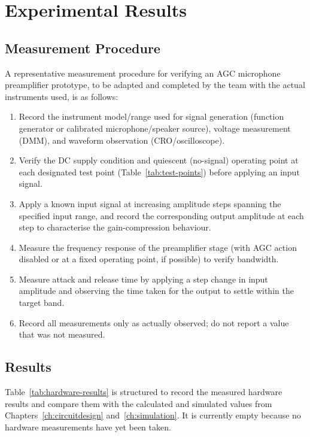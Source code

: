 \chapter{Experimental Results}
\label{ch:results}

\section{Measurement Procedure}

A representative measurement procedure for verifying an AGC microphone preamplifier prototype, to be adapted and completed by the team with the actual instruments used, is as follows:
\begin{enumerate}
    \item Record the instrument model/range used for signal generation (function generator or calibrated microphone/speaker source), voltage measurement (DMM), and waveform observation (CRO/oscilloscope).
    \item Verify the DC supply condition and quiescent (no-signal) operating point at each designated test point (Table~\ref{tab:test-points}) before applying an input signal.
    \item Apply a known input signal at increasing amplitude steps spanning the specified input range, and record the corresponding output amplitude at each step to characterise the gain-compression behaviour.
    \item Measure the frequency response of the preamplifier stage (with AGC action disabled or at a fixed operating point, if possible) to verify bandwidth.
    \item Measure attack and release time by applying a step change in input amplitude and observing the time taken for the output to settle within the target band.
    \item Record all measurements only as actually observed; do not report a value that was not measured.
\end{enumerate}

\section{Results}

Table~\ref{tab:hardware-results} is structured to record the measured hardware results and compare them with the calculated and simulated values from Chapters~\ref{ch:circuitdesign} and~\ref{ch:simulation}. It is currently empty because no hardware measurements have yet been taken.

